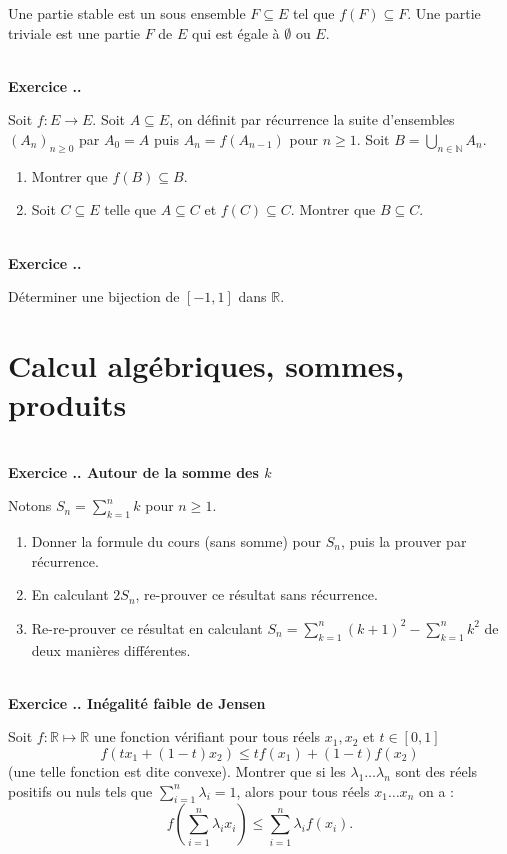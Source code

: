 \documentclass{article}
\newcommand{\mb}[1]{\mathbb{#1}}
\newcounter{exo}
\newcommand{\exercice}[1][\null]{\textbf{\\ \large Exercice \thesection.\theexo. \normalsize #1} \addtocounter{exo}{1}}
\begin{document}
Une partie stable est un sous ensemble $F \subseteq E$ tel 
que $f(F) \subseteq F$. Une partie triviale est une partie $F$
de $E$ qui est égale à $\emptyset$ ou $E$.



\exercice 
Soit $f : E \rightarrow E$. Soit $A \subseteq E$, on définit par récurrence la suite d'ensembles $(A_n)_{n \ge 0}$ par $A_0 = A$ puis $A_n = f(A_{n-1})$ pour $n \ge 1$. Soit $\displaystyle B = \bigcup_{n \in \mb{N}} A_n$.

\begin{enumerate}

\item Montrer que $f(B) \subseteq B$.

\item Soit $C \subseteq E$ telle que $A \subseteq C$ et $f(C) \subseteq C$. Montrer que $B \subseteq C$.
\end{enumerate}





\exercice 

Déterminer une bijection de $[-1,1]$ dans $\mb{R}$.


\section{Calcul algébriques, sommes, produits}


\exercice[Autour de la somme des $k$]

Notons $S_n = \sum_{k=1}^n k $ pour $n \ge 1$.

\begin{enumerate}

\item Donner la formule du cours (sans somme) pour $S_n$, puis la prouver par récurrence.

\item En calculant $2 S_n$, re-prouver ce résultat sans récurrence.

\item Re-re-prouver ce résultat en calculant $S_n = \sum_{k=1}^n (k+1)^2 -  \sum_{k=1}^n k^2  $ de deux manières différentes.
\end{enumerate}




\exercice[Inégalité faible de Jensen]

Soit $f: \mb{R} \mapsto \mb{R}$ une fonction vérifiant pour tous réels $x_1, x_2$ et $t \in [0,1]$
$$f(t x_1 +(1-t) x_2) \le t f(x_1) +(1-t) f(x_2)$$  (une telle fonction est dite convexe).
Montrer que si les $\lambda_1 \dots \lambda_n$ sont des réels positifs ou nuls tels que $\sum_{i=1}^n \lambda_i = 1$, alors pour tous réels $x_1 \dots x_n$ on a :
$$f\left(\sum_{i=1}^n \lambda_i x_i\right) \le \sum_{i=1}^n \lambda_i f(x_i).$$
\end{document}
